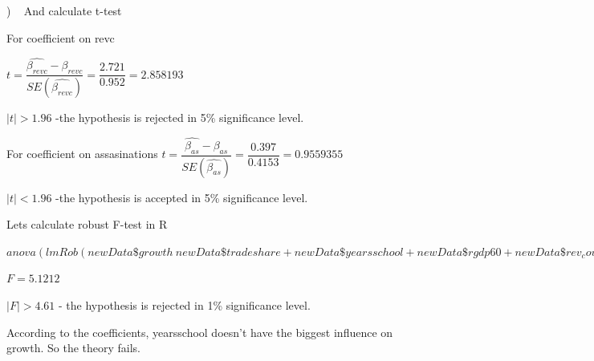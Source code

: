 \documentclass[12pt]{article}
\begin{document}
\begin{list}{) ~}{}
And calculate t-test

For coefficient on revc

$t = \dfrac{\hat{\beta_{revc}}-\beta_{revc}}{SE(\hat{\beta_{revc}})} = \dfrac{2.721}{0.952}=2.858193$

$\left|t\right|>1.96$ -the hypothesis is rejected in 5\% significance level.

For coefficient on assasinations
$t = \dfrac{\hat{\beta_{as}}-\beta_{as}}{SE(\hat{\beta_{as}})} = \dfrac{0.397}{0.4153}=0.9559355$

$\left|t\right|<1.96$ -the hypothesis is accepted in 5\% significance level.

\item Lets calculate robust F-test in R

$anova(lmRob(newData\$growth~newData\$tradeshare+newData\$yearsschool+newData\$rgdp60+newData\$rev_coups+newData\$assasinations), lmRob(newData\$growth~newData\$tradeshare+newData\$yearsschool+newData\$rgdp60))$

$F = 5.1212$

$\left|F\right|>4.61$ - the hypothesis is rejected in 1\% significance level. 
\item
According to the coefficients, yearsschool doesn't have the biggest influence on growth. So the theory fails.
\end{list}
\end{document}
